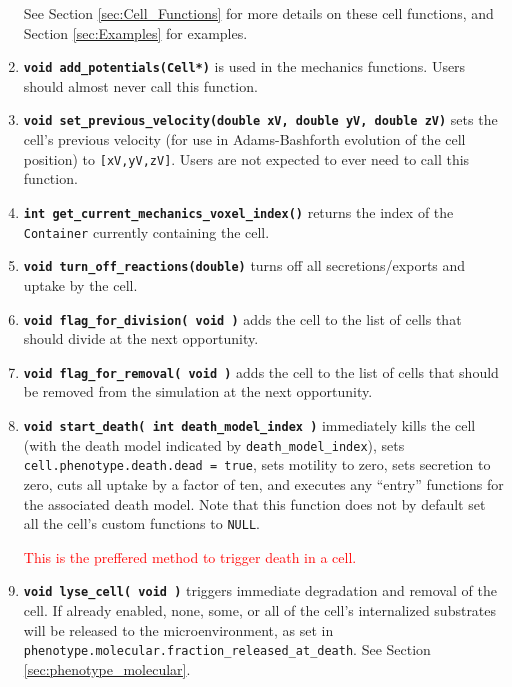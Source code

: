 \documentclass[12pt]{article}
\renewcommand{\v}{\verb}
\newcommand{\smallcode}[1]{\textbf{\texttt{#1}}}
\newcommand{\red}[1]{\textcolor{red}{#1}}
\begin{document}
\begin{enumerate}
See Section \ref{sec:Cell_Functions} for more details on these 
cell functions, and Section \ref{sec:Examples} for examples. 

\item 
\smallcode{void add\_potentials(Cell*)} is used in the mechanics functions. 
Users should almost never call this function. 

\item 
\smallcode{void set\_previous\_velocity(double xV, double yV, double zV)} 
sets the cell's previous velocity (for use in Adams-Bashforth evolution 
of the cell position) to \v|[xV,yV,zV]|. 
Users are not expected to ever need to call this 
function. 

\item 
\smallcode{int get\_current\_mechanics\_voxel\_index()} returns the 
index of the \v|Container| currently containing the cell. 

\item 
\smallcode{void turn\_off\_reactions(double)} turns off all 
secretions/exports and uptake by the cell. 

\item   
\smallcode{void flag\_for\_division( void )} adds the cell to the 
list of cells that should divide at the next opportunity. 

\item 
\smallcode{void flag\_for\_removal( void )} adds the cell to the 
list of cells that should be removed from the simulation 
at the next opportunity. 

\item
\smallcode{void start\_death( int death\_model\_index )} immediately 
kills the cell (with the death model indicated by 
\v|death_model_index|), sets \v|cell.phenotype.death.dead = true|, sets 
motility to zero, sets secretion to zero, cuts all uptake by a factor 
of ten, and executes any ``entry'' functions for the associated 
death model. Note that this function does not by default set all the 
cell's custom functions to \v|NULL|. 

\red{This is the preffered method to trigger death in a cell.} 

\item 
\smallcode{void lyse\_cell( void )} triggers immediate degradation and 
removal of the cell. If already enabled, none, some, or all of the cell's 
internalized substrates will be released to the microenvironment, as 
set in \v|phenotype.molecular.fraction_released_at_death|. See Section 
\ref{sec:phenotype_molecular}. 


\end{enumerate}
\end{document}
